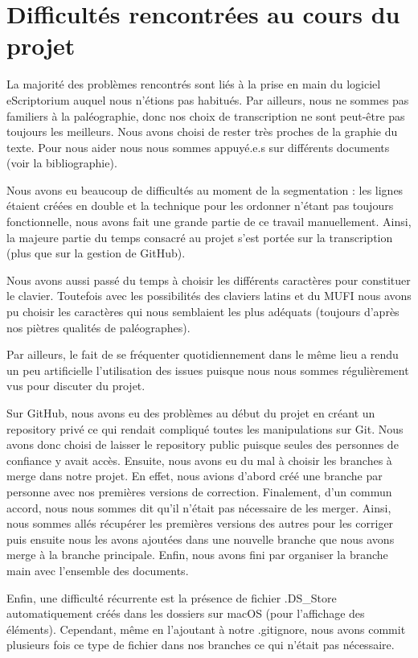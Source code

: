 \documentclass{article}
\begin{document}
\section{Difficultés rencontrées au cours du projet}
La majorité des problèmes rencontrés sont liés à la prise en main du logiciel eScriptorium auquel nous n’étions pas habitués. Par ailleurs, nous ne sommes pas familiers à la paléographie, donc nos choix de transcription ne sont peut-être pas toujours les meilleurs. Nous avons choisi de rester très proches de la graphie du texte. Pour nous aider nous nous sommes appuyé.e.s sur différents documents (voir la bibliographie). 

Nous avons eu beaucoup de difficultés au moment de la segmentation : les lignes étaient créées en double et la technique pour les ordonner n’étant pas toujours fonctionnelle, nous avons fait une grande partie de ce travail manuellement. Ainsi, la majeure partie du temps consacré au projet s’est portée sur la transcription (plus que sur la gestion de GitHub). 

Nous avons aussi passé du temps à choisir les différents caractères pour constituer le clavier. Toutefois avec les possibilités des claviers latins et du MUFI nous avons pu choisir les caractères qui nous semblaient les plus adéquats (toujours d’après nos piètres qualités de paléographes). 

Par ailleurs, le fait de se fréquenter quotidiennement dans le même lieu a rendu un peu artificielle l’utilisation des issues puisque nous nous sommes régulièrement vus pour discuter du projet. 

Sur GitHub, nous avons eu des problèmes au début du projet en créant un repository privé ce qui rendait compliqué toutes les manipulations sur Git. Nous avons donc choisi de laisser le repository public puisque seules des personnes de confiance y avait accès. 
Ensuite, nous avons eu du mal à choisir les branches à merge dans notre projet. En effet, nous avions d’abord créé une branche par personne avec nos premières versions de correction. Finalement, d’un commun accord, nous nous sommes dit qu’il n’était pas nécessaire de les merger. Ainsi, nous sommes allés récupérer les premières versions des autres pour les corriger puis ensuite nous les avons ajoutées dans une nouvelle branche que nous avons merge à la branche principale. Enfin, nous avons fini par organiser la branche main avec l’ensemble des documents. 

Enfin, une difficulté récurrente est la présence de fichier .DS\_Store automatiquement créés dans les dossiers sur macOS (pour l’affichage des éléments). Cependant, même en l’ajoutant à notre .gitignore, nous avons commit plusieurs fois ce type de fichier dans nos branches ce qui n’était pas nécessaire.
\end{document}

